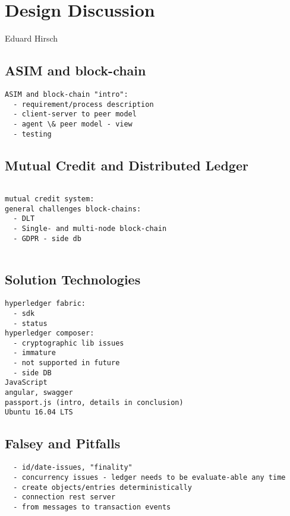\chapter{Design Discussion}
\label{ch:design}

\vspace{-1cm}
\begin{center}
Eduard Hirsch
\end{center}

\section{ASIM and block-chain}
\label{sec:asim}

\begin{verbatim}
ASIM and block-chain "intro":
  - requirement/process description
  - client-server to peer model
  - agent \& peer model - view 
  - testing
\end{verbatim}

\section{Mutual Credit and Distributed Ledger}
\label{sec:dlt} 

\begin{verbatim}

mutual credit system:
general challenges block-chains:
  - DLT
  - Single- and multi-node block-chain
  - GDPR - side db
  
\end{verbatim}
  
\section{Solution Technologies}
\label{sec:solution}

\begin{verbatim}
hyperledger fabric:
  - sdk
  - status
hyperledger composer:
  - cryptographic lib issues
  - immature
  - not supported in future
  - side DB
JavaScript
angular, swagger
passport.js (intro, details in conclusion)
Ubuntu 16.04 LTS
\end{verbatim}

\section{Falsey and Pitfalls}

\begin{verbatim}
  - id/date-issues, "finality"
  - concurrency issues - ledger needs to be evaluate-able any time
  - create objects/entries deterministically
  - connection rest server
  - from messages to transaction events
\end{verbatim}